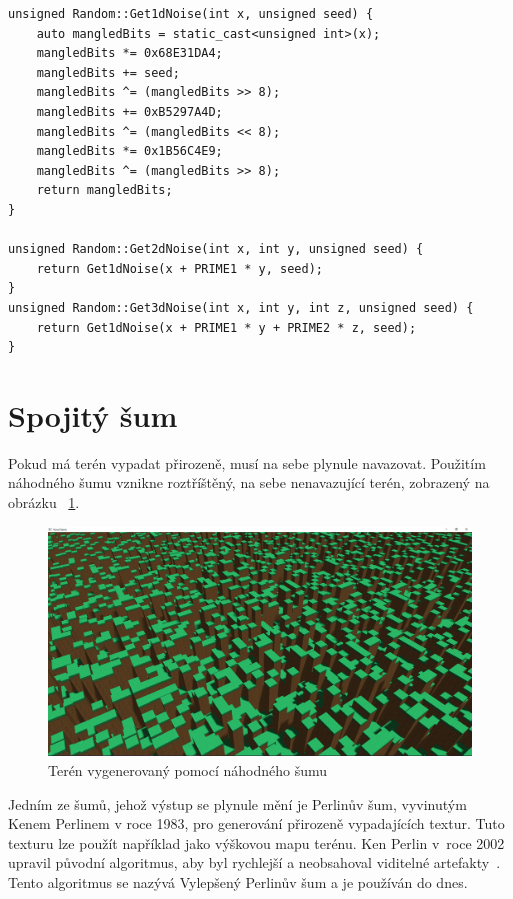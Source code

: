 \documentclass[thesis=M,czech]{FITthesis}[2019/12/23]
\begin{document}
\begin{verbatim}
unsigned Random::Get1dNoise(int x, unsigned seed) {
    auto mangledBits = static_cast<unsigned int>(x);
    mangledBits *= 0x68E31DA4;
    mangledBits += seed;
    mangledBits ^= (mangledBits >> 8);
    mangledBits += 0xB5297A4D;
    mangledBits ^= (mangledBits << 8);
    mangledBits *= 0x1B56C4E9;
    mangledBits ^= (mangledBits >> 8);
    return mangledBits;
}

unsigned Random::Get2dNoise(int x, int y, unsigned seed) {
    return Get1dNoise(x + PRIME1 * y, seed);
}
unsigned Random::Get3dNoise(int x, int y, int z, unsigned seed) {
    return Get1dNoise(x + PRIME1 * y + PRIME2 * z, seed);
}
\end{verbatim}

\section{Spojitý šum}

Pokud má terén vypadat přirozeně, musí na sebe plynule navazovat. Použitím náhodného šumu vznikne roztříštěný, na sebe nenavazující terén, zobrazený na obrázku ~\ref{fig:random_terrain}.

\begin{figure}\centering
	\includegraphics[width=\textwidth]{images/world_gen/random_terrain}
	\caption[Terén vygenerovaný pomocí náhodného šumu]{Terén vygenerovaný pomocí náhodného šumu}\label{fig:random_terrain}
\end{figure}

Jedním ze šumů, jehož výstup se plynule mění je Perlinův šum, vyvinutým Kenem Perlinem v roce 1983, pro generování přirozeně vypadajících textur. Tuto texturu lze použít například jako výškovou mapu terénu. Ken Perlin v~roce 2002 upravil původní algoritmus, aby byl rychlejší a neobsahoval viditelné artefakty~\cite{perlin_noise}. Tento algoritmus se nazývá Vylepšený Perlinův šum a je používán do dnes.
\end{document}
